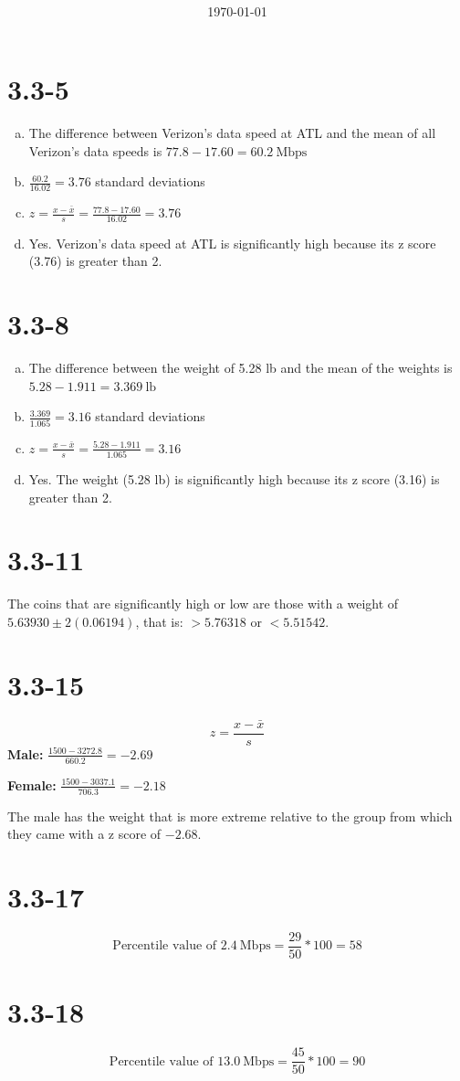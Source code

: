 \documentclass[12pt,fleqn]{article}
\title{\classdescription\ \\ \classname\ \\ $\ $ \\ \assignment}
\author{\authorname}
\date{\today}
\newcommand{\chapter}{3.3}
\newcommand{\problem}[1]{\vspace{5ex}\section*{\chapter-#1}}
\begin{document}
\maketitle

\problem{5}
\begin{enumerate}[(a)]
  \item The difference between Verizon's data speed at ATL and the mean of all Verizon's data speeds is $77.8 - 17.60 = 60.2~\text{Mbps}$
  \item $\frac{60.2}{16.02} = 3.76$ standard deviations
  \item $z = \frac{x - \bar{x}}{s} = \frac{77.8 - 17.60}{16.02} = 3.76$
  \item Yes. Verizon's data speed at ATL is significantly high because its z score (3.76) is greater than 2.
\end{enumerate}

\problem{8}
\begin{enumerate}[(a)]
  \item The difference between the weight of 5.28 lb and the mean of the weights is $5.28 - 1.911 = 3.369~\text{lb}$
  \item $\frac{3.369}{1.065} = 3.16$ standard deviations
  \item $z = \frac{x - \bar{x}}{s} = \frac{5.28 - 1.911}{1.065} = 3.16$
  \item Yes. The weight (5.28 lb) is significantly high because its z score (3.16) is greater than 2.
\end{enumerate}


\problem{11}
The coins that are significantly high or low are those with a weight of $5.63930 \pm 2(0.06194)$, that is: $> 5.76318$ or $< 5.51542$.


\problem{15}
\begin{equation*}
  z = \frac{x - \bar{x}}{s}
\end{equation*}
\textbf{Male:} $\frac{1500 - 3272.8}{660.2} = -2.69$

\textbf{Female:} $\frac{1500 - 3037.1}{706.3} = -2.18$

The male has the weight that is more extreme relative to the group from which they came with a z score of $-2.68$.


\problem{17}
\begin{equation*}
  \text{Percentile value of } 2.4~\text{Mbps} = \frac{29}{50} * 100 = 58
\end{equation*}


\problem{18}
\begin{equation*}
  \text{Percentile value of } 13.0~\text{Mbps} = \frac{45}{50} * 100 = 90
\end{equation*}
\end{document}
